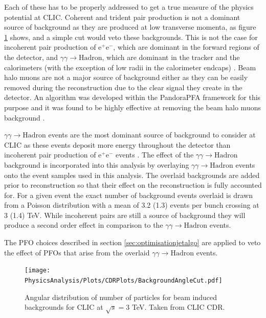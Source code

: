 Each of these has to be properly addressed to get a true measure of the physics potential at CLIC.  Coherent and trident pair production is not a dominant source of background as they are produced at low transverse momenta, as figure \ref{fig:backgroundangle} shows, and a simple cut would veto these backgrounds.  This is not the case for incoherent pair production of $\text{e}^{+}\text{e}^{-}$, which are dominant in the forward regions of the detector, and $\gamma\gamma \rightarrow \text{Hadron}$, which are dominant in the tracker and the calorimeters (with the exception of low radii in the calorimeter endcaps) \cite{Linssen:2012hp, Sailer:2012mfa}.  Beam halo muons are not a major source of background either as they can be easily removed during the reconstruction due to the clear signal they create in the detector.  An algorithm was developed within the PandoraPFA framework for this purpose and it was found to be highly effective at removing the beam halo muons background \cite{Linssen:2012hp}.  

$\gamma\gamma \rightarrow \text{Hadron}$ events are the most dominant source of background to consider at CLIC as these events deposit more energy throughout the detector than incoherent pair production of $\text{e}^{+}\text{e}^{-}$ events \cite{Linssen:2012hp}.  The effect of the $\gamma\gamma \rightarrow \text{Hadron}$ background is incorporated into this analysis by overlaying $\gamma\gamma \rightarrow \text{Hadron}$ events onto the event samples used in this analysis.  The overlaid backgrounds are added prior to reconstruction so that their effect on the reconstruction is fully accounted for.  For a given event the exact number of background events overlaid is drawn from a Poisson distribution with a mean of 3.2 (1.3) events per bunch crossing at 3 (1.4) TeV.  While incoherent pairs are still a source of background they will produce a second order effect in comparison to the $\gamma\gamma \rightarrow \text{Hadron}$ events.

The PFO choices described in section \ref{sec:optimisationjetalgo} are applied to veto the effect of PFOs that arise from the overlaid $\gamma\gamma \rightarrow \text{Hadron}$ events.

\begin{figure}
\texttt{[image: PhysicsAnalysis/Plots/CDRPlots/BackgroundAngleCut.pdf]}
\caption[]{Angular distribution of number of particles for beam induced backgrounds for CLIC at $\sqrt{s} = 3$ TeV.  Taken from CLIC CDR.}
\label{fig:backgroundangle}
\end{figure}

